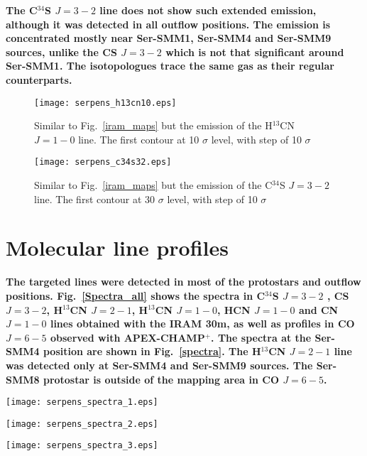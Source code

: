 \documentclass{aa}
\begin{document}
\begin{appendix}
\textbf{The C$^{34}$S $J=3-2$ line does not show such extended emission, although it was detected in all outflow positions. The emission is concentrated mostly near Ser-SMM1, Ser-SMM4 and Ser-SMM9 sources, unlike the CS $J=3-2$ which is not that significant around Ser-SMM1. The isotopologues trace the same gas as their regular counterparts.}

\begin{figure} \texttt{[image: serpens\_h13cn10.eps]} \caption{Similar to Fig.~\ref{iram_maps}
but the emission of the H$^{13}$CN $J=1-0$ line. The first contour at 10 $\sigma$ level, with step
of 10 $\sigma$} \label{h13cn10} \end{figure}


\begin{figure} \texttt{[image: serpens\_c34s32.eps]} \caption{Similar to Fig.~\ref{iram_maps}
but the emission of the C$^{34}$S $J=3-2$ line. The first contour at 30 $\sigma$ level, with step of
10 $\sigma$} \label{c34s32} \end{figure}

\section{Molecular line profiles}

\textbf{The targeted lines were detected in most of the protostars and outflow positions. Fig.~\ref{Spectra_all} shows the spectra in C$^{34}$S $J=3-2$ , CS $J=3-2$,  H$^{13}$CN $J=2-1$, H$^{13}$CN $J=1-0$, HCN $J=1-0$ and CN $J=1-0$  lines obtained with the IRAM 30m, as well as profiles in CO $J=6-5$ observed with APEX-CHAMP$^+$. The spectra at the Ser-SMM4 position are shown in Fig.~\ref{spectra}. The H$^{13}$CN $J=2-1$ line was detected only at Ser-SMM4 and Ser-SMM9 sources. The Ser-SMM8 protostar is outside of the mapping area in CO $J=6-5$.}



\begin{figure*} 
\centering 
\texttt{[image: serpens\_spectra\_1.eps]}
\label{Spectra1} 
\end{figure*} 

\begin{figure*} 
\centering
\texttt{[image: serpens\_spectra\_2.eps]} 
\label{Spectra2} 
\end{figure*}

\begin{figure*}
\centering 
\texttt{[image: serpens\_spectra\_3.eps]}
\label{Spectra3} 
\end{figure*} 


\end{appendix}
\end{document}
